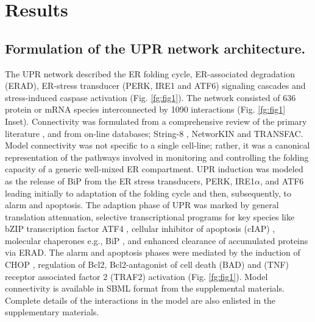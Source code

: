 \documentclass[fleqn,10pt]{wlscirep}
\begin{document}
\section*{Results}

\subsection*{Formulation of the UPR network architecture.}
The UPR network described the ER folding cycle, ER-associated degradation (ERAD), ER-stress transducer (PERK, IRE1 and ATF6) signaling cascades and stress-induced caspase activation (Fig. \ref{fg:fig1}).
The network consisted of 636 protein or mRNA species interconnected by 1090 interactions (Fig. \ref{fg:fig1} Inset).
Connectivity was formulated from a comprehensive review of the primary literature  \cite{naidoo2009er, ron2002translational, kaufman2002unfolded,ellgaard2003qce,Fonseca:2009fk,Schroder:2005vn,gotoh:hdc,mccullough2001gsc, belmont2008cga,Hetz:2009qc,Urano:2000uq,szegezdi2006mediators}, and from on-line databases; String-8 \cite{Jensen:2009fk}, NetworKIN \cite{Linding:2007fk} and TRANSFAC.
Model connectivity was not specific to a single cell-line; rather, it was a canonical representation of the pathways involved in monitoring and controlling the folding capacity of a generic well-mixed ER compartment.
UPR induction was modeled as the release of BiP from the ER stress transducers, PERK, IRE1$\alpha$, and ATF6 leading initially to adaptation of the folding cycle and then, subsequently, to alarm and apoptosis.
The adaption phase of UPR was marked by general translation attenuation, selective transcriptional programs for key species like bZIP transcription factor ATF4 \cite{lu2004tra}, cellular inhibitor of apoptosis (cIAP) \cite{hamanaka2008pdr}, molecular chaperones e.g., BiP \cite{harding2003isr}, and enhanced clearance of accumulated proteins via ERAD.
The alarm and apoptosis phases were mediated by the induction of CHOP \cite{ron1992cnd}, regulation of Bcl2, Bcl2-antagonist of cell death (BAD) \cite {wang1999cia} and (TNF) receptor associated factor 2 (TRAF2) \cite{lei2003jpb,putcha2003jmb, yamamoto1999bpa, szegezdi2006mediators} activation (Fig. \ref{fg:fig1}).
Model connectivity is available in SBML format from the supplemental materials. Complete details of the interactions in the model are also enlisted in the supplementary materials.

\end{document}
